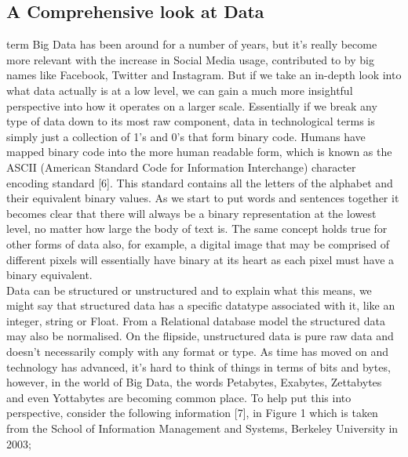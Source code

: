 \documentclass[10pt,journal,compsoc]{IEEEtran}
\begin{document}
\subsection{A Comprehensive look at Data}
 term Big Data has been around for a number of years, but it's really become more relevant with the increase in Social Media usage, contributed to by big names like Facebook, Twitter and Instagram. But if we take an in-depth look into what data actually is at a low level, we can gain a much more insightful perspective into how it operates on a larger scale. Essentially if we break any type of data down to its most raw component, data in technological terms is simply just a collection of 1's and 0's that form binary code. Humans have mapped binary code into the more human readable form, which is known as the ASCII (American Standard Code for Information Interchange) character encoding standard [6]. This standard contains all the letters of the alphabet and their equivalent binary values. As we start to put words and sentences together it becomes clear that there will always be a binary representation at the lowest level, no matter how large the body of text is. The same concept holds true for other forms of data also, for example, a digital image that may be comprised of different pixels will essentially have binary at its heart as each pixel must have a binary equivalent. \\  Data can be structured or unstructured and to explain what this means, we might say that structured data has a specific datatype associated with it, like an integer, string or Float. From a Relational database model the structured data may also be normalised. On the flipside, unstructured data is pure raw data and doesn't necessarily comply with any format or type. As time has moved on and technology has advanced, it's hard to think of things in terms of bits and bytes, however, in the world of Big Data, the words Petabytes, Exabytes, Zettabytes and even Yottabytes are becoming common place. To help put this into perspective, consider the following information [7], in Figure 1 which is taken from the School of Information Management and Systems, Berkeley University in 2003;\\
\end{document}
